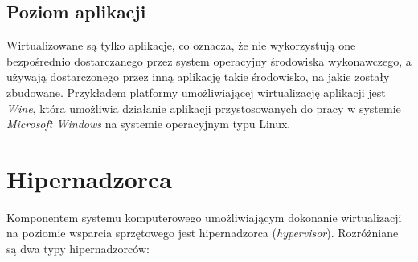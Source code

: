 \documentclass[polish, a4paper, 12pt, oneside]{book}
\begin{document}
	\subsection {Poziom aplikacji}
	Wirtualizowane są tylko aplikacje, co oznacza, że nie wykorzystują one bezpośrednio dostarczanego przez system operacyjny środowiska wykonawczego, a używają dostarczonego przez inną aplikację takie środowisko, na jakie zostały zbudowane. Przykładem platformy umożliwiającej wirtualizację aplikacji jest \textit{Wine}\cite{wine}, która umożliwia działanie aplikacji przystosowanych do pracy w systemie \textit{Microsoft Windows}\cite{windows} na systemie operacyjnym typu Linux.
	
	\section{Hipernadzorca}
	Komponentem systemu komputerowego umożliwiającym dokonanie wirtualizacji na poziomie wsparcia sprzętowego jest hipernadzorca (\textit{hypervisor}). Rozróżniane są dwa typy hipernadzorców:
	
\end{document}
